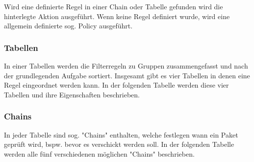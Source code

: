 \documentclass[
a4paper,     %
 headsepline, %
footsepline, %
titlepage,   %
 halfparskip,     %
 fleqn,       %
12pt         %
]{scrartcl}  %
\begin{document}
Wird eine definierte Regel in einer Chain oder Tabelle gefunden wird die hinterlegte Aktion ausgeführt. Wenn keine Regel definiert wurde, wird eine allgemein definierte sog. Policy ausgeführt.

\subsubsection{Tabellen}
In einer Tabellen werden die Filterregeln zu Gruppen zusammengefasst und nach der grundlegenden Aufgabe sortiert. Insgesamt gibt es vier Tabellen in denen eine Regel eingeordnet werden kann. In der folgenden Tabelle werden diese vier Tabellen und ihre Eigenschaften beschrieben\cite{iptables-1}. 

\begin{table}[!h]
\centering
{}
\caption{IP-Tables: Tabellen}
\label{Tables: Tabellen}
\end{table}
 
\subsubsection{Chains}
In jeder Tabelle sind sog. "Chains" enthalten, welche festlegen wann ein Paket geprüft wird, bspw. bevor es verschickt werden soll. In der folgenden Tabelle werden alle fünf verschiedenen möglichen "Chains" beschrieben\cite{iptables-1}. 
\end{document}
